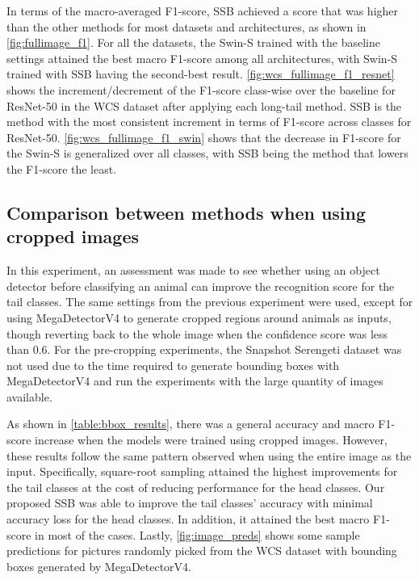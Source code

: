 

In terms of the macro-averaged F1-score, SSB achieved a score that was higher
than the other methods for most datasets and architectures, as shown in
\autoref{fig:fullimage_f1}. For all the datasets, the Swin-S trained with the
baseline settings attained the best macro F1-score among all architectures, with
Swin-S trained with SSB having the second-best result.
\autoref{fig:wcs_fullimage_f1_resnet} shows the increment/decrement of the
F1-score class-wise over the baseline for ResNet-50 in the WCS dataset after
applying each long-tail method. SSB is the method with the most consistent
increment in terms of F1-score across classes for ResNet-50.
\autoref{fig:wcs_fullimage_f1_swin} shows that the decrease in F1-score for the
Swin-S is generalized over all classes, with SSB being the method that lowers
the F1-score the least.

\subsection{Comparison between methods when using cropped images}

In this experiment, an assessment was made to see whether using an object
detector before classifying an animal can improve the recognition score for the
tail classes. The same settings from the previous experiment were used, except
for using MegaDetectorV4 to generate cropped regions around animals as inputs,
though reverting back to the whole image when the confidence score was less than
0.6. For the pre-cropping experiments, the Snapshot Serengeti dataset was not
used due to the time required to generate bounding boxes with MegaDetectorV4 and
run the experiments with the large quantity of images available.

As shown in \autoref{table:bbox_results}, there was a general accuracy and macro
F1-score increase when the models were trained using cropped images. However,
these results follow the same pattern observed when using the entire image as
the input. Specifically, square-root sampling attained the highest improvements
for the tail classes at the cost of reducing performance for the head classes.
Our proposed SSB was able to improve the tail classes’ accuracy with minimal
accuracy loss for the head classes. In addition, it attained the best macro
F1-score in most of the cases. Lastly, \autoref{fig:image_preds} shows some
sample predictions for pictures randomly picked from the WCS dataset with
bounding boxes generated by MegaDetectorV4.

